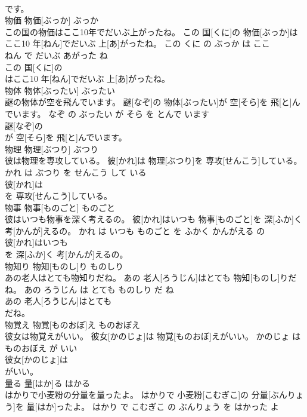 \documentclass[8pt]{extreport}
\begin{document}
\begin{CJK}{UTF8}{min}
\\	です。			
\\	物価	物価[ぶっか]	ぶっか	
\\	この国の物価はここ10年でだいぶ上がったね。	この 国[くに]の 物価[ぶっか]はここ10 年[ねん]でだいぶ 上[あ]がったね。	この くに の ぶっか は ここ 
\\	ねん で だいぶ あがった ね	
\\	この 国[くに]の
\\	はここ10 年[ねん]でだいぶ 上[あ]がったね。			
\\	物体	物体[ぶったい]	ぶったい	
\\	謎の物体が空を飛んでいます。	謎[なぞ]の 物体[ぶったい]が 空[そら]を 飛[と]んでいます。	なぞ の ぶったい が そら を とんで います	
\\	謎[なぞ]の
\\	が 空[そら]を 飛[と]んでいます。			
\\	物理	物理[ぶつり]	ぶつり	
\\	彼は物理を専攻している。	彼[かれ]は 物理[ぶつり]を 専攻[せんこう]している。	かれ は ぶつり を せんこう して いる	
\\	彼[かれ]は
\\	を 専攻[せんこう]している。			
\\	物事	物事[ものごと]	ものごと	
\\	彼はいつも物事を深く考えるの。	彼[かれ]はいつも 物事[ものごと]を 深[ふか]く 考[かんが]えるの。	かれ は いつも ものごと を ふかく かんがえる の	
\\	彼[かれ]はいつも
\\	を 深[ふか]く 考[かんが]えるの。			
\\	物知り	物知[ものし]り	ものしり	
\\	あの老人はとても物知りだね。	あの 老人[ろうじん]はとても 物知[ものし]りだね。	あの ろうじん は とても ものしり だ ね	
\\	あの 老人[ろうじん]はとても
\\	だね。			
\\	物覚え	物覚[ものおぼ]え	ものおぼえ	
\\	彼女は物覚えがいい。	彼女[かのじょ]は 物覚[ものおぼ]えがいい。	かのじょ は ものおぼえ が いい	
\\	彼女[かのじょ]は
\\	がいい。			
\\	量る	量[はか]る	はかる	
\\	はかりで小麦粉の分量を量ったよ。	はかりで 小麦粉[こむぎこ]の 分量[ぶんりょう]を 量[はか]ったよ。	はかり で こむぎこ の ぶんりょう を はかった よ	

\end{CJK}
\end{document}
